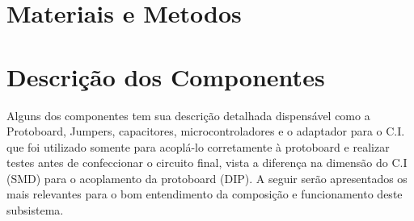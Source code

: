 \section{Materiais e Metodos}

\section{Descrição dos Componentes}
Alguns dos componentes tem sua descrição detalhada dispensável como a Protoboard, Jumpers, capacitores, microcontroladores e o adaptador para o C.I. que foi utilizado somente para acoplá-lo corretamente à protoboard e realizar testes antes de confeccionar o circuito final, vista a diferença na dimensão do C.I (SMD) para o acoplamento da protoboard (DIP). A seguir serão apresentados os mais relevantes para o bom entendimento da composição e funcionamento deste subsistema.

